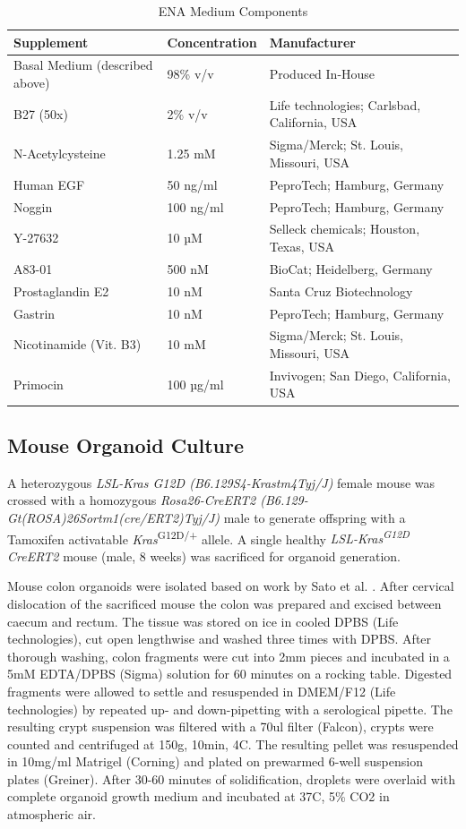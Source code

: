 \begin{flushleft}
\begin{table}[htbp]
\caption{ENA Medium Components}
\label{tab:ena_medium_supplements}
\begin{tabularx}{\textwidth}{Xll}
\toprule
\textbf{Supplement} & \textbf{Concentration} & \textbf{Manufacturer} \\
\midrule
Basal Medium (described above) & 98\% v/v & Produced In-House \\
B27 (50x) & 2\% v/v & Life technologies; Carlsbad, California, USA \\
N-Acetylcysteine & 1.25 mM & Sigma/Merck; St. Louis, Missouri, USA \\
Human EGF & 50 ng/ml & PeproTech; Hamburg, Germany \\
Noggin & 100 ng/ml & PeproTech; Hamburg, Germany \\
Y-27632 & 10 µM & Selleck chemicals; Houston, Texas, USA \\
A83-01 & 500 nM & BioCat; Heidelberg, Germany \\
Prostaglandin E2 & 10 nM & Santa Cruz Biotechnology \\
Gastrin & 10 nM & PeproTech; Hamburg, Germany \\
Nicotinamide (Vit. B3) & 10 mM & Sigma/Merck; St. Louis, Missouri, USA \\
Primocin & 100 µg/ml & Invivogen; San Diego, California, USA \\
\bottomrule
\end{tabularx}
\end{table}


\subsection{Mouse Organoid Culture}
A heterozygous \textit{LSL-Kras G12D (B6.129S4-Krastm4Tyj/J)} female mouse was crossed with a homozygous \textit{Rosa26-CreERT2 (B6.129-Gt(ROSA)26Sortm1(cre/ERT2)Tyj/J)} male to generate offspring with a Tamoxifen activatable \textit{Kras}\textsuperscript{G12D/+} allele. A single healthy \textit{LSL-Kras\textsuperscript{G12D} CreERT2} mouse (male, 8 weeks) was sacrificed for organoid generation. \par 

Mouse colon organoids were isolated based on work by Sato et al. \citep{satoSingleLgr5Stem2009}. After cervical dislocation of the sacrificed mouse the colon was prepared and excised between caecum and rectum. The tissue was stored on ice in cooled DPBS (Life technologies), cut open lengthwise and washed three times with DPBS. After thorough washing, colon fragments were cut into 2mm pieces and incubated in a 5mM EDTA/DPBS (Sigma) solution for 60 minutes on a rocking table. Digested fragments were allowed to settle and resuspended in DMEM/F12 (Life technologies) by repeated up- and down-pipetting with a serological pipette. The resulting crypt suspension was filtered with a 70ul filter (Falcon), crypts were counted and centrifuged at 150g, 10min, 4C. The resulting pellet was resuspended in 10mg/ml Matrigel (Corning) and plated on prewarmed 6-well suspension plates (Greiner). After 30-60 minutes of solidification, droplets were overlaid with complete organoid growth medium and incubated at 37C, 5\% CO2 in atmospheric air.


\end{flushleft}
